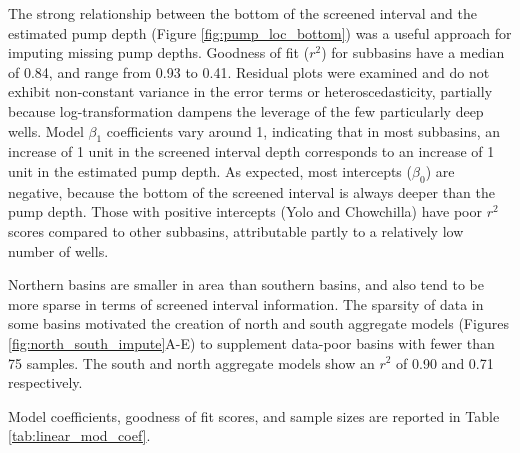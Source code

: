 The strong relationship between the bottom of the screened interval and the estimated pump depth (Figure \ref{fig:pump_loc_bottom}) was a useful approach for imputing missing pump depths. Goodness of fit ($r^2$) for subbasins have a median of 0.84, and range from 0.93 to 0.41. Residual plots were examined and do not exhibit non-constant variance in the error terms or heteroscedasticity, partially because log-transformation dampens the leverage of the few particularly deep wells. Model $\beta_1$ coefficients vary around 1, indicating that in most subbasins, an increase of 1 unit in the screened interval depth corresponds to an increase of 1 unit in the estimated pump depth. As expected, most intercepts ($\beta_0$) are negative, because the bottom of the screened interval is always deeper than the pump depth. Those with positive intercepts (Yolo and Chowchilla) have poor $r^2$ scores compared to other subbasins, attributable partly to a relatively low number of wells.  

Northern basins are smaller in area than southern basins, and also tend to be more sparse in terms of screened interval information. The sparsity of data in some basins motivated the creation of north and south aggregate models (Figures \ref{fig:north_south_impute}A-E) to supplement data-poor basins with fewer than 75 samples. The south and north aggregate models show an $r^2$ of 0.90 and 0.71 respectively. 

Model coefficients, goodness of fit scores, and sample sizes are reported in Table \ref{tab:linear_mod_coef}.


